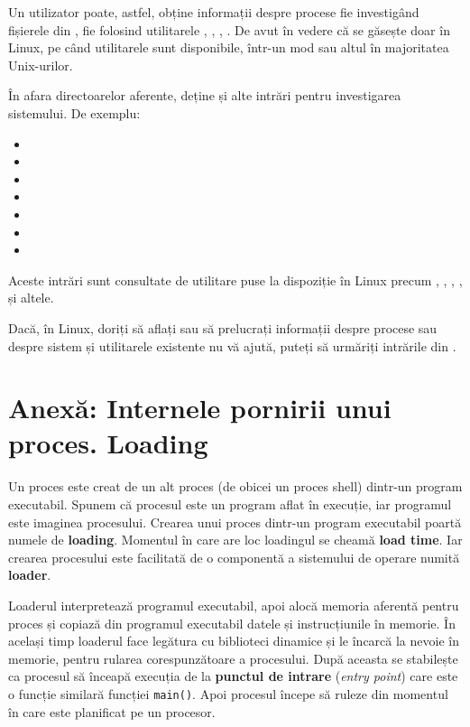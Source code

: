 Un utilizator poate, astfel, obține informații despre procese fie investigând fișierele din , fie folosind utilitarele , , , .
De avut în vedere că  se găsește doar în Linux, pe când utilitarele sunt disponibile, într-un mod sau altul în majoritatea Unix-urilor.

În afara directoarelor aferente,  deține și alte intrări pentru investigarea sistemului.
De exemplu:

\begin{itemize}
  \item {}
  \item {}
  \item {}
  \item {}
  \item {}
  \item {}
  \item {}
\end{itemize}

Aceste intrări sunt consultate de utilitare puse la dispoziție în Linux precum , , , ,  și altele.

\begin{note}
  Dacă, în Linux, doriți să aflați sau să prelucrați informații despre procese sau despre sistem și utilitarele existente nu vă ajută, puteți să urmăriți intrările din .
\end{note}

\section{Anexă: Internele pornirii unui proces. Loading}
\label{sec:process:loading}

Un proces este creat de un alt proces (de obicei un proces shell) dintr-un program executabil.
Spunem că procesul este un program aflat în execuție, iar programul este imaginea procesului.
Crearea unui proces dintr-un program executabil poartă numele de \textbf{loading}.
Momentul în care are loc loadingul se cheamă \textbf{load time}.
Iar crearea procesului este facilitată de o componentă a sistemului de operare numită \textbf{loader}.

Loaderul interpretează programul executabil, apoi alocă memoria aferentă pentru proces și copiază din programul executabil datele și instrucțiunile în memorie.
În același timp loaderul face legătura cu biblioteci dinamice și le încarcă la nevoie în memorie, pentru rularea corespunzătoare a procesului.
După aceasta se stabilește ca procesul să înceapă execuția de la \textbf{punctul de intrare} (\textit{entry point}) care este o funcție similară funcției \texttt{main()}.
Apoi procesul începe să ruleze din momentul în care este planificat pe un procesor.

